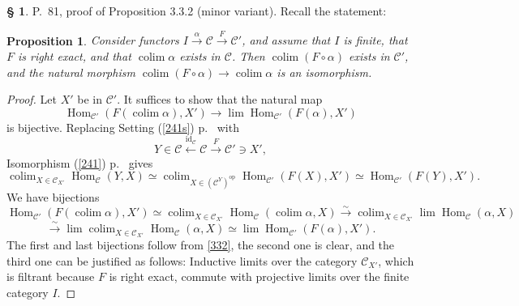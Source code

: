 \documentclass[12pt]{article}%
\newtheorem{prop}[thm]{Proposition}
\theoremstyle{remark}
\theoremstyle{definition}
\newtheorem{s}[thm]{\S}%
\newcommand{\C}{\mathcal C}
\newcommand{\xr}{\xrightarrow}
\DeclareMathOperator*{\colim}{colim}
\DeclareMathOperator{\id}{id}
\DeclareMathOperator{\Hom}{Hom}%
\DeclareMathOperator{\op}{op}
\begin{document}
\begin{s} P.~81, proof of Proposition 3.3.2 (minor variant). Recall the statement:
%
\begin{prop} 
%
Consider functors $I\xrightarrow\alpha\C\xrightarrow F\C'$, and assume that $I$ is finite, that $F$ is right exact, and that $\colim\alpha$ exists in $\C$. Then $\colim(F\circ\alpha)$ exists in $\C'$, and the natural morphism $\colim(F\circ\alpha)\to\colim\alpha$ is an isomorphism. 
%
\end{prop} 
%
\begin{proof}
Let $X'$ be in $\C'$. It suffices to show that the natural map 
$$
\Hom_{\C'}(F(\colim\alpha),X')\to\lim\Hom_{\C'}(F(\alpha),X')
$$ 
%
is bijective. Replacing Setting (\ref{241s}) p.~\pageref{241s} with 
$$
Y\in\C\xleftarrow{\id_\C}\C\xrightarrow{F}\C'\ni X', 
$$ 
Isomorphism (\ref{241}) p.~\pageref{241} gives 
%
\begin{equation}\label{332} 
\colim_{X\in\C_{X'}}\Hom_\C(Y,X)\simeq\colim_{X\in(\C^Y)^{\op}}\Hom_{\C'}(F(X),X')\simeq\Hom_{\C'}(F(Y),X').
\end{equation} 
%
We have bijections 
$$ 
\Hom_{\C'}(F(\colim\alpha),X')\simeq\colim_{X\in\C_{X'}}\Hom_\C(\colim\alpha,X)\xr\sim\colim_{X\in\C_{X'}}\lim\Hom_\C(\alpha,X) 
$$ 
$$
\xr\sim\lim\colim_{X\in\C_{X'}}\Hom_\C(\alpha,X)\simeq\lim\Hom_{\C'}(F(\alpha),X'). 
$$ 
The first and last bijections follow from \eqref{332}, the second one is clear, and the third one can be justified as follows: Inductive limits over the category $\C_{X'}$, which is filtrant because $F$ is right exact, commute with projective limits over the finite category $I$.
\end{proof}
\end{s}

\end{document}
